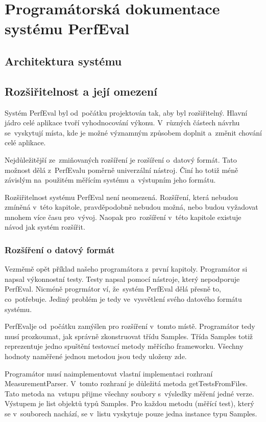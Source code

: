 \chapter{Programátorská dokumentace systému PerfEval}

\section{Architektura systému}

\section{Rozšiřitelnost a její omezení}

Systém PerfEval byl od~počátku projektován tak, aby byl rozšiřitelný. Hlavní jádro
celé aplikace tvoří vyhodnocování výkonu. V~různých částech návrhu se~vyskytují místa,
kde je možné významným způsobem doplnit a~změnit chování celé aplikace.

Nejdůležitější ze~zmiňovaných rozšíření je rozšíření o~datový formát. Tato možnost dělá z~PerfEvalu
poměrně univerzální nástroj. Činí ho totiž méně závislým na~použitém měřícím systému a~výstupním jeho formátu.

Rozšiřitelnost systému PerfEval není neomezená. Rozšíření, která nebudou zmíněná v~této kapitole,
pravděpodobně nebudou možná, nebo budou vyžadovat mnohem více času pro~vývoj. Naopak pro~rozšíření
v~této kapitole existuje návod jak systém rozšířit.

\subsection{Rozšíření o datový formát}

Vezměmě opět příklad našeho programátora z~první kapitoly. Programátor si napsal výkonnostní testy.
Testy napsal pomocí nástroje, který nepodporuje PerfEval. Nicméně progrmátor ví, že~systém PerfEval
dělá přesně to, co~potřebuje. Jediný problém je tedy ve~vysvětlení svého datového formátu systému.

PerfEvalje od~počátku zamýšlen pro rozšíření v~tomto místě. Programátor tedy musí prozkoumat, jak správně zkonstruovat
třídu Samples. Třída Samples totiž reprezentuje jedno spuštění testovací metody měřícího frameworku. Všechny hodnoty
naměřené jednou metodou jsou tedy uloženy zde.

Programátor musí naimplementovat vlastní implementaci rozhraní MeasurementParser. V~tomto rozhraní je důležitá metoda
getTestsFromFiles. Tato metoda na~vstupu přijme všechny soubory s~výsledky měření jedné verze. Výstupem je list objektů
typů Samples. Pro každou metodu (měřící test), který se v~souborech nachází, se v~listu vyskytuje pouze jedna instance
typu Samples.

